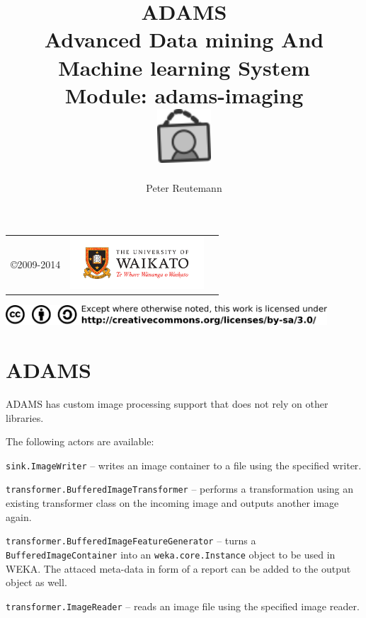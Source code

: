 \documentclass[a4paper]{book}
\title{
  \textbf{ADAMS} \\
  {\Large \textbf{A}dvanced \textbf{D}ata mining \textbf{A}nd \textbf{M}achine
  learning \textbf{S}ystem} \\
  {\Large Module: adams-imaging} \\
  \vspace{1cm}
  \includegraphics[width=2cm]{images/imaging-module.png} \\
}
\author{
  Peter Reutemann
}
\begin{document}
\begin{titlepage}
\maketitle

\thispagestyle{empty}
\center
\begin{table}[b]
	\begin{tabular}{c l l}
		\parbox[c][2cm]{2cm}{\copyright 2009-2014} &
		\parbox[c][2cm]{5cm}{\includegraphics[width=5cm]{images/coat_of_arms.pdf}} \\
	\end{tabular}
	\includegraphics[width=12cm]{images/cc.png} \\
\end{table}

\end{titlepage}

\tableofcontents
\listoffigures


\chapter{ADAMS}
ADAMS has custom image processing support that does not rely on other libraries.

The following actors are available:
\begin{tight_itemize}
	\item \texttt{sink.ImageWriter} -- writes an image container to a file
	using the specified writer.
	\item \texttt{transformer.BufferedImageTransformer} -- performs a transformation
	using an existing transformer class on the incoming image and
	outputs another image again.
	\item \texttt{transformer.BufferedImageFeatureGenerator} -- turns a
	\texttt{BufferedImageContainer} into an \texttt{weka.core.Instance} object to
	be used in WEKA. The attaced meta-data in form of a report can be added to the
	output object as well.
	\item \texttt{transformer.ImageReader} -- reads an image file using the 
	specified image reader.
\end{tight_itemize}
\end{document}
